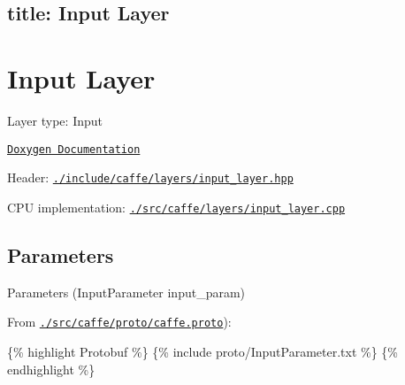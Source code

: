 

 \subsection*{title\+: Input Layer }

\section*{Input Layer}


\begin{DoxyItemize}
\item Layer type\+: {\ttfamily Input}
\item \href{http://caffe.berkeleyvision.org/doxygen/classcaffe_1_1InputLayer.html}{\tt Doxygen Documentation}
\item Header\+: \href{https://github.com/BVLC/caffe/blob/master/include/caffe/layers/input_layer.hpp}{\tt {\ttfamily ./include/caffe/layers/input\+\_\+layer.hpp}}
\item C\+PU implementation\+: \href{https://github.com/BVLC/caffe/blob/master/src/caffe/layers/input_layer.cpp}{\tt {\ttfamily ./src/caffe/layers/input\+\_\+layer.cpp}}
\end{DoxyItemize}

\subsection*{Parameters}


\begin{DoxyItemize}
\item Parameters ({\ttfamily Input\+Parameter input\+\_\+param})
\item From \href{https://github.com/BVLC/caffe/blob/master/src/caffe/proto/caffe.proto}{\tt {\ttfamily ./src/caffe/proto/caffe.proto}})\+:
\end{DoxyItemize}

\{\% highlight Protobuf \%\} \{\% include proto/\+Input\+Parameter.\+txt \%\} \{\% endhighlight \%\} 